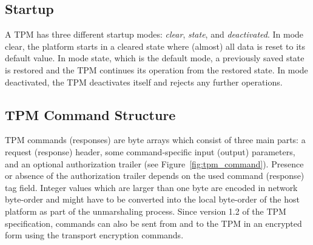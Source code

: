 \documentclass[runningheads]{llncs}
\begin{document}
\subsection{Startup}
A TPM has three different startup modes: \emph{clear}, \emph{state},
and \emph{deactivated}. In mode clear, the platform starts in a cleared state
where (almost) all data is reset to its default value. In mode state, which
is the default mode, a previously saved state is restored and the TPM
continues its operation from the restored state. In mode deactivated, the
TPM deactivates itself and rejects any further operations.



\subsection{TPM Command Structure}
TPM commands (responses) are byte arrays which consist of three main parts:
a request (response) header, some command-specific input (output) parameters,
and an optional authorization trailer (see Figure~\ref{fig:tpm_command}).
Presence or absence of the authorization trailer depends on the used command
(response) tag field. Integer values which are larger than one byte are
encoded in network byte-order and might have to be converted into the local
byte-order of the host platform as part of the unmarshaling process. Since
version 1.2 of the TPM specification, commands can also be sent from and to
the TPM in an encrypted form using the transport encryption commands.
\end{document}

